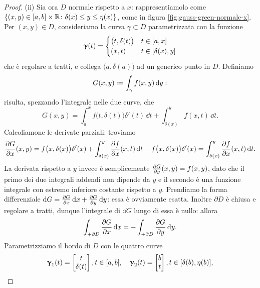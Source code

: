 \begin{proof}
	
	(ii) Sia ora $D$ normale rispetto a $x$: rappresentiamolo come $\{(x,y)\in[a,b]\times\mathbb{R}\colon\delta(x)\leq y\leq\eta(x)\}$, come in figura \ref{fig:gauss-green-normale-x}.
	Per $(x,y)\in D$, consideriamo la curva $\gamma\subset D$ parametrizzata con la funzione
	\begin{equation*}
		\bm{\upgamma}(t)=
		\begin{cases}
			\big(t,\delta(t)\big) &t\in[a,x]\\
			(x,t) &t\in[\delta(x),y]
		\end{cases}
	\end{equation*}
	che è regolare a tratti, e collega $\big(a,\delta(a)\big)$ ad un generico punto in $D$.
	Definiamo
	\begin{equation*}
		G(x,y)\defeq\int_{\gamma}f(x,y)\,\dd y:
	\end{equation*}
	risulta, spezzando l'integrale nelle due curve, che
	\begin{equation}
		G(x,y)=\int_a^xf\big(t,\delta(t)\big)\delta'(t)\,\dd t+\int_{\delta(x)}^yf(x,t)\,\dd t.
	\end{equation}
	Calcoliamone le derivate parziali: troviamo
	\begin{equation}
		\frac{\partial {G}}{\partial {x}}(x,y)=f\big(x,\delta(x)\big)\delta'(x)+\int_{\delta(x)}^y\frac{\partial {f}}{\partial {x}}(x,t)\,\textup{d} t-f\big(x,\delta(x)\big)\delta'(x)=\int_{\delta(x)}^y\frac{\partial {f}}{\partial {x}}(x,t)\,\textup{d} t.
	\end{equation}
	La derivata rispetto a $y$ invece è semplicemente $\frac{\partial {G}}{\partial {y}}(x,y)=f(x,y)$, dato che il primo dei due integrali addendi non dipende da $y$ e il secondo è una funzione integrale con estremo inferiore costante rispetto a $y$.
	Prendiamo la forma differenziale $\textup{d} G=\frac{\partial {G}}{\partial {x}}\,\textup{d} x+\frac{\partial {G}}{\partial {y}}\,\textup{d} y$: essa è ovviamente esatta.
	Inoltre $\partial D$ è chiusa e regolare a tratti, dunque l'integrale di $\dd G$ lungo di essa è nullo: allora
	\begin{equation}
		\int_{+\partial D}\frac{\partial {G}}{\partial {x}}\,\textup{d} x=-\int_{+\partial D}\frac{\partial {G}}{\partial {y}}\,\textup{d} y.
		\label{eq:dim-gauss-green-forma-esatta}
	\end{equation}
	Parametrizziamo il bordo di $D$ con le quattro curve
	\begin{gather*}
		\vgamma_1(t)=
		\begin{bmatrix}
			t\\\delta(t)
		\end{bmatrix}, t\in[a,b],\quad
		\vgamma_2(t)=
		\begin{bmatrix}
			b\\t
		\end{bmatrix}, t\in[\delta(b),\eta(b)],\\

\end{gather*}
\end{proof}
